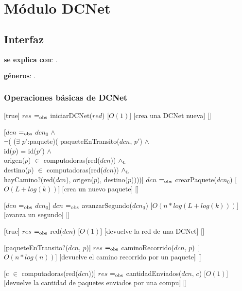 \section{Módulo DCNet}

\subsection{Interfaz}

\textbf{se explica con}: .

\textbf{géneros}: .

\subsubsection{Operaciones básicas de DCNet}

[true]
{$res$ $=_{\mathrm{obs}}$ iniciarDCNet($red$)}
[$O(1)$]
[crea una DCNet nueva]
[]
~

[$dcn$ $=_{\mathrm{obs}}$ $dcn_0$ $\land$ \\
$\neg$( ($\exists$ $p'$:paquete)(	paqueteEnTransito($dcn$, $p'$) $\land$ \\
									id($p$) = id($p'$) $\land$ \\
									origen($p$) $\in$ computadoras(red($dcn$)) $\land_{\mathrm{\scriptscriptstyle{L}}}$ \\
									destino($p$) $\in$ computadoras(red($dcn$)) $\land_{\mathrm{\scriptscriptstyle{L}}}$ \\
									hayCamino?(red($dcn$), origen($p$), destino($p$))))]
{$dcn$ $=_{\mathrm{obs}}$ crearPaquete($dcn_0$)}
[$O(L + log(k))$]
[crea un nuevo paquete]
[]
~

[$dcn$ $=_{\mathrm{obs}}$ $dcn_0$]
{$dcn$ $=_{\mathrm{obs}}$ avanzarSegundo($dcn_0$)}
[$O(n * log(L + log(k)))$]
[avanza un segundo]
[]
~

[true]
{$res$ $=_{\mathrm{obs}}$ red($dcn$)}
[$O(1)$]
[devuelve la red de una DCNet]
[]
~

[paqueteEnTransito?($dcn$, $p$)]
{$res$ $=_{\mathrm{obs}}$ caminoRecorrido($dcn$, $p$)}
[$O(n * log(n))$]
[devuelve el camino recorrido por un paquete]
[]
~

[c $\in$ computadoras(red($dcn$))]
{$res$ $=_{\mathrm{obs}}$ cantidadEnviados($dcn$, $c$)}
[$O(1)$]
[devuelve la cantidad de paquetes enviados por una compu]
[]
~

